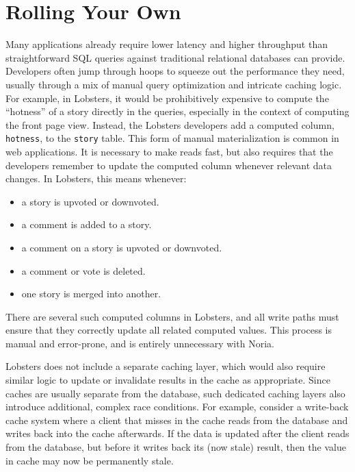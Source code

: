 \section{Rolling Your Own}
\label{s:eval:existing}

Many applications already require lower latency and higher throughput than
straightforward SQL queries against traditional relational databases can
provide. Developers often jump through hoops to squeeze out the performance they
need, usually through a mix of manual query optimization and intricate caching
logic. For example, in Lobsters, it would be prohibitively expensive to compute
the ``hotness'' of a story directly in the queries, especially in the context of
computing the front page view. Instead, the Lobsters developers add a computed
column, \texttt{hotness}, to the \texttt{story} table. This form of manual
materialization is common in web applications. It is necessary to make reads
fast, but also requires that the developers remember to update the computed
column whenever relevant data changes. In Lobsters, this means whenever:

\begin{itemize}
    \item a story is upvoted or downvoted.
    \item a comment is added to a story.
    \item a comment on a story is upvoted or downvoted.
    \item a comment or vote is deleted.
    \item one story is merged into another.
\end{itemize}

There are several such computed columns in Lobsters, and all write paths must
ensure that they correctly update all related computed values. This process is
manual and error-prone, and is entirely unnecessary with Noria.

Lobsters does not include a separate caching layer, which would also require
similar logic to update or invalidate results in the cache as appropriate. Since
caches are usually separate from the database, such dedicated caching layers
also introduce additional, complex race conditions. For example, consider a
write-back cache system where a client that misses in the cache reads from the
database and writes back into the cache afterwards. If the data is updated after
the client reads from the database, but before it writes back its (now stale)
result, then the value in cache may now be permanently stale.

